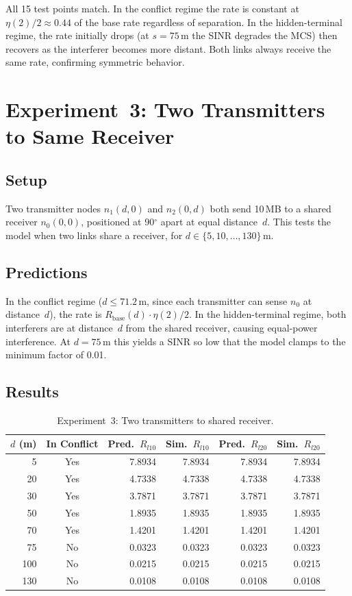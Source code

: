 \documentclass[11pt,a4paper]{article}
\begin{document}
All 15 test points match. In the conflict regime the rate is constant at $\eta(2)/2 \approx 0.44$ of the base rate regardless of separation. In the hidden-terminal regime, the rate initially drops (at $s=75\,$m the SINR degrades the MCS) then recovers as the interferer becomes more distant. Both links always receive the same rate, confirming symmetric behavior.

\section{Experiment~3: Two Transmitters to Same Receiver}
\label{sec:exp3}

\subsection{Setup}
Two transmitter nodes $n_1(d,0)$ and $n_2(0,d)$ both send 10\,MB to a shared receiver $n_0(0,0)$, positioned at 90$^\circ$ apart at equal distance~$d$. This tests the model when two links share a receiver, for $d \in \{5, 10, \ldots, 130\}\,$m.

\subsection{Predictions}
In the conflict regime ($d \leq 71.2\,$m, since each transmitter can sense $n_0$ at distance~$d$), the rate is $R_{\text{base}}(d) \cdot \eta(2)/2$. In the hidden-terminal regime, both interferers are at distance~$d$ from the shared receiver, causing equal-power interference. At $d=75\,$m this yields a SINR so low that the model clamps to the minimum factor of 0.01.

\subsection{Results}

\begin{table}[h]
\centering
\caption{Experiment~3: Two transmitters to shared receiver.}
\label{tab:exp3}
\begin{tabular}{rcrrrr}
\toprule
$d$ (m) & In Conflict & Pred.\ $R_{l10}$ & Sim.\ $R_{l10}$ & Pred.\ $R_{l20}$ & Sim.\ $R_{l20}$ \\
\midrule
  5 & Yes & 7.8934 & 7.8934 & 7.8934 & 7.8934 \\
 20 & Yes & 4.7338 & 4.7338 & 4.7338 & 4.7338 \\
 30 & Yes & 3.7871 & 3.7871 & 3.7871 & 3.7871 \\
 50 & Yes & 1.8935 & 1.8935 & 1.8935 & 1.8935 \\
 70 & Yes & 1.4201 & 1.4201 & 1.4201 & 1.4201 \\
 75 &  No & 0.0323 & 0.0323 & 0.0323 & 0.0323 \\
100 &  No & 0.0215 & 0.0215 & 0.0215 & 0.0215 \\
130 &  No & 0.0108 & 0.0108 & 0.0108 & 0.0108 \\
\bottomrule
\end{tabular}
\end{table}
\end{document}
